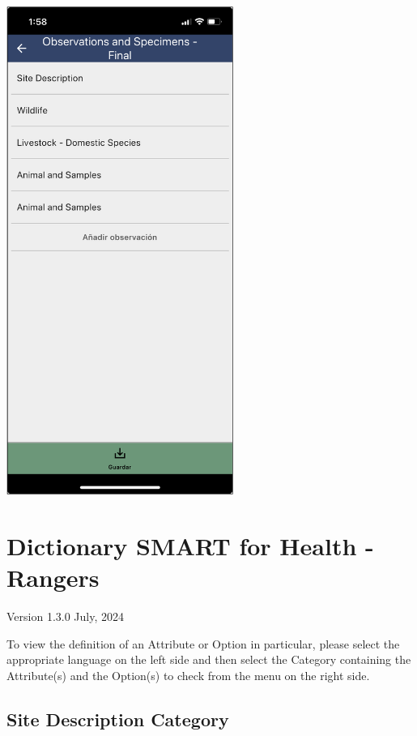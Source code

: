 \documentclass[
  letterpaper,
  DIV=11,
  numbers=noendperiod]{scrreprt}
\begin{document}
\includegraphics[width=2.91667in,height=\textheight]{Pictures_for_manual/picture19.png}


\hypertarget{dictionary-smart-for-health---rangers}{%
\chapter*{Dictionary SMART for Health -
Rangers}\label{dictionary-smart-for-health---rangers}}


Version 1.3.0 July, 2024

To view the definition of an Attribute or Option in particular, please
select the appropriate language on the left side and then select the
Category containing the Attribute(s) and the Option(s) to check from the
menu on the right side.

\hypertarget{site-description-category}{%
\section*{Site Description Category}\label{site-description-category}}
\end{document}
